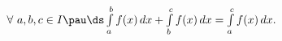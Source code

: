 
    	$\forall\  a,b,c\in I\pau \ds\int\limits_a^bf(x)\,dx+\int\limits_b^cf(x)\,dx=\int\limits_a^cf(x)\,dx.$
    